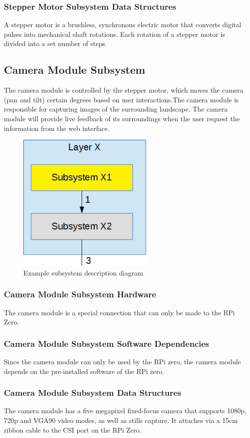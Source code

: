 \subsubsection{Stepper Motor Subsystem Data Structures}
A stepper motor is a brushless, synchronous electric motor that converts digital pulses into mechanical shaft rotations. Each rotation of a stepper motor is divided into a set number of steps.



\subsection{Camera Module Subsystem}
The camera module is controlled by the stepper motor, which moves the camera (pan and tilt) certain degrees based on user interactions.The camera module is responsible for capturing images of the surrounding landscape. The camera module will provide live feedback of its surroundings when the user request the information from the web interface.

\begin{figure}[h!]
	\centering
 	\includegraphics[width=0.60\textwidth]{images/subsystem}
 \caption{Example subsystem description diagram}
\end{figure}

\subsubsection{Camera Module Subsystem Hardware}
The camera module is a special connection that can only be made to the RPi Zero.


\subsubsection{Camera Module Subsystem Software Dependencies}
Since the camera module can only be used by the RPi zero, the camera module depends on the pre-installed software of the RPi zero.


\subsubsection{Camera Module Subsystem Data Structures}
The camera module has a five megapixel fixed-focus camera that supports 1080p, 720p and VGA90 video modes, as well as stills capture. It attaches via a 15cm ribbon cable to the CSI port on the RPi Zero.
